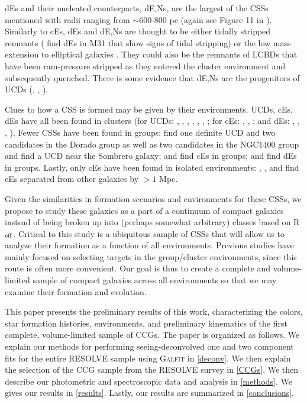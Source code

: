 \documentclass[iop,apj]{emulateapj}
\newcommand{\Reff}{R$_{\rm eff}$}
\begin{document}
dEs and their nucleated counterparts, dE,Ns, are the largest of the CSSs mentioned with radii ranging from $\sim$600-800 pc (again see Figure 11 in \citet{Norris2014}). Similarly to cEs, dEs and dE,Ns are thought to be either tidally stripped remnants (\citet{Crnojevi2014} find dEs in M31 that show signs of tidal stripping) or the low mass extension to elliptical galaxies \citep{Crawford2016}. They could also be the remnants of LCBDs that have been ram-pressure stripped as they entered the cluster environment and subsequently quenched. There is some evidence that dE,Ns are the progenitors of UCDs (\citet{Pfeffer2013}, \citet{Zhang2015}, \citet{Liu2015}).

Clues to how a CSS is formed may be given by their environments. UCDs, cEs, dEs have all been found in clusters (for UCDs: \citet{Price2009}, \citet{Madrid2010}, \citet{Hasegan2005}, \citet{Jones2006}, \citet{Mieske2009}, \citet{Wehner2007}, \citet{Misgeld2008}; for cEs: \citet{Chilingarian2007}, \citet{SmithCastelli2012}, \citet{Price2009}; and dEs: \citep{SmithCastelli2012}, \citet{Koo1994}, \citet{Guzman1996}, \citet{Crawford2016}). Fewer CSSs have been found in groups: \citet{Evstigneeva2007} find one definite UCD and two candidates in the Dorado group as well as two candidates in the NGC1400 group and \citet{Hau2009} find a UCD near the Sombrero galaxy; \citet{Huxor2011} and \citet{Chilingarian2010} find cEs in groups; and \citet{Crnojevi2014}  \citet{Penny2014} find dEs in groups. Lastly, only cEs have been found in isolated environments: \citet{Huxor2013}, \citet{Paudel2014}, and \citet{Chilingarian2015} find cEs separated from other galaxies by $>1$ Mpc.

Given the similarities in formation scenarios and environments for these CSSs, we propose to study these galaxies as a part of a continuum of compact galaxies instead of being broken up into (perhaps somewhat arbitrary) classes based on \Reff. Critical to this study is a ubiquitous sample of CSSs that will allow us to analyze their formation as a function of all environments. Previous studies have mainly focused on selecting targets in the group/cluster environments, since this route is often more convenient. Our goal is thus to create a complete and volume-limited sample of compact galaxies across all environments so that we may examine their formation and evolution.

This paper presents the preliminary results of this work, characterizing the colors, star formation histories, environments, and preliminary kinematics of the first complete, volume-limited sample of CCGs. The paper is organized as follows. We explain our methods for performing seeing-deconvolved one and two component fits for the entire RESOLVE sample using \textsc{Galfit} in \autoref{deconv}. We then explain the selection of the CCG sample from the RESOLVE survey in \autoref{CCGs}. We then describe our photometric and spectroscopic data and analysis in \autoref{methods}. We gives our results in \autoref{results}. Lastly, our results are summarized in \autoref{conclusions}.
\end{document}
